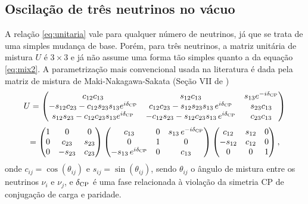 \documentclass[12pt]{report}
\begin{document}
\subsection{Oscilação de três neutrinos no vácuo} \label{sec:3nu-vacuo}


A relação \ref{eq:unitaria} vale para qualquer número de neutrinos, já que se trata de uma simples mudança de base. Porém, para três neutrinos, a matriz unitária de mistura $U$ é $3 \times 3$ e já não assume uma forma tão simples quanto a da equação \ref{eq:mix2}. A parametrização mais convencional usada na literatura é dada pela matriz de mistura de Maki-Nakagawa-Sakata (Seção VII de \cite{gonzalez})
\begin{equation} \label{eq:mixmatrix}
U =
\begin{pmatrix}
c_{12} c_{13} & s_{12} c_{13} & s_{13} e^{-i\delta_{\text{CP}}} \\
-s_{12}c_{23} - c_{12}s_{23}s_{13}e^{i\delta_{\text{CP}}} & c_{12}c_{23} - s_{12}s_{23}s_{13} \, e^{i\delta_{\text{CP}}} & s_{23}c_{13} \\
s_{12}s_{23} - c_{12}c_{23}s_{13}e^{i\delta_{\text{CP}}} & -c_{12}s_{23} - s_{12}c_{23}s_{13} \, e^{i\delta_{\text{CP}}} & c_{23}c_{13} \\
\end{pmatrix}
\end{equation}
\begin{equation} \label{eq:3matrices}
=
\begin{pmatrix}
1 & 0 & 0 \\
0 & c_{23} & s_{23} \\
0 & -s_{23} & c_{23} \\
\end{pmatrix}
\begin{pmatrix}
c_{13} & 0 & s_{13} \, e^{-i\delta_{\text{CP}}} \\
0 & 1 & 0 \\
-s_{13} \, e^{i\delta_{\text{CP}}} & 0 & c_{13} \\
\end{pmatrix}
\begin{pmatrix}
c_{12} & s_{12} & 0 \\
-s_{12} & c_{12} & 0 \\
0 & 0 & 1 \\
\end{pmatrix},
\end{equation}
onde $c_{ij} = \cos(\theta_{ij})$ e $s_{ij} = \sin(\theta_{ij})$, sendo $\theta_{ij}$ o ângulo de mistura entre os neutrinos $\nu_i$ e $\nu_j$, e $\delta_{\text{CP}}$ é uma fase relacionada à violação da simetria CP de conjugação de carga e paridade.
\end{document}
